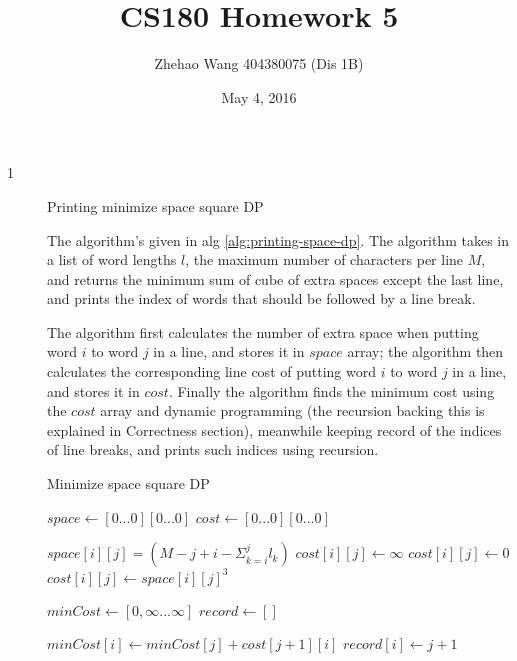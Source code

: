 \documentclass{article}
\title{CS180 Homework 5}
\author{Zhehao Wang 404380075 (Dis 1B)}
\date{May 4, 2016}
\begin{document}
\maketitle

\begin{description}

\item[1]{Printing minimize space square DP}

  The algorithm's given in alg \ref{alg:printing-space-dp}. The algorithm takes in a list of word lengths $l$, the maximum number of characters per line $M$, and returns the minimum sum of cube of extra spaces except the last line, and prints the index of words that should be followed by a line break.

  The algorithm first calculates the number of extra space when putting word $i$ to word $j$ in a line, and stores it in $space$ array; the algorithm then calculates the corresponding line cost of putting word $i$ to word $j$ in a line, and stores it in $cost$. Finally the algorithm finds the minimum cost using the $cost$ array and dynamic programming (the recursion backing this is explained in Correctness section), meanwhile keeping record of the indices of line breaks, and prints such indices using recursion. 

  \begin{algorithm}[H]
  \caption{Minimize space square DP}
  \label{alg:printing-space-dp}
    \begin{algorithmic}[1]


      \State $space \gets [0...0][0...0]$
      \State $cost \gets [0...0][0...0]$

          \State $space[i][j] = (M - j + i - \Sigma_{k=i}^{j}{l_k})$
            \State $cost[i][j] \gets \infty$
            \State $cost[i][j] \gets 0$
          \Else
            \State $cost[i][j] \gets space[i][j]^3$
          \EndIf
        \EndFor
      \EndFor

      $minCost \gets [0, \infty...\infty]$
      $record \gets []$

            \State $minCost[i] \gets minCost[j] + cost[j+1][i]$
            \State $record[i] \gets j+1$
          \EndIf
        \EndFor
      \EndFor


\end{algorithmic}
\end{algorithm}
\end{description}
\end{document}
